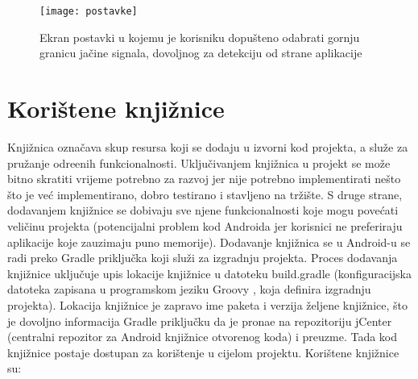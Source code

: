 \begin{figure}[!htbp]
	\begin{center}
 \texttt{[image: postavke]}
 \caption{Ekran postavki u kojemu je korisniku dopu\v{s}teno odabrati gornju granicu ja\v{c}ine signala, dovoljnog za detekciju od strane aplikacije}
 \label{fig:postavke}
	\end{center}
\end{figure}


\section{Kori\v{s}tene knji\v{z}nice}

Knji\v{z}nica ozna\v{c}ava skup resursa koji se dodaju u izvorni kod projekta, a slu\v{z}e za pru\v{z}anje odre\dj enih funkcionalnosti. Uklju\v{c}ivanjem knji\v{z}nica u projekt se mo\v{z}e bitno skratiti vrijeme potrebno za razvoj jer nije potrebno implementirati ne\v{s}to \v{s}to je ve\'{c} implementirano, dobro testirano i stavljeno na tr\v{z}i\v{s}te. S druge strane, dodavanjem knji\v{z}nice se dobivaju sve njene funkcionalnosti koje mogu pove\'{c}ati veli\v{c}inu projekta (potencijalni problem kod Androida jer korisnici ne preferiraju aplikacije koje zauzimaju puno memorije).
Dodavanje knji\v{z}nica se u Android-u se radi preko Gradle priklju\v{c}ka \cite{gradle} koji slu\v{z}i za izgradnju projekta. Proces dodavanja knji\v{z}nice uklju\v{c}uje upis lokacije knji\v{z}nice u datoteku build.gradle (konfiguracijska datoteka zapisana u programskom jeziku Groovy \cite{groovy}, koja definira izgradnju projekta). Lokacija knji\v{z}nice je zapravo ime paketa i verzija \v{z}eljene knji\v{z}nice, \v{s}to je dovoljno informacija Gradle priklju\v{c}ku da je prona\dj e na repozitoriju jCenter \cite{jcenter} (centralni repozitor za Android knji\v{z}nice otvorenog koda) i preuzme. Tada kod knji\v{z}nice postaje dostupan za kori\v{s}tenje u cijelom projektu.
Kori\v{s}tene knji\v{z}nice su:

